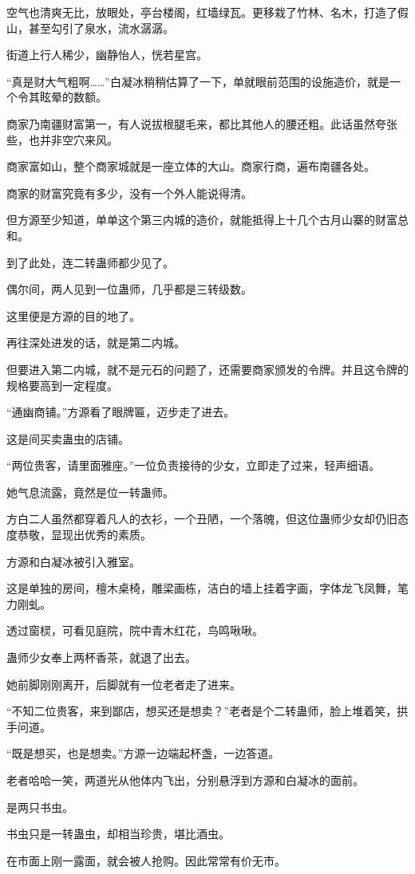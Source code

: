 \begin{this_body}
空气也清爽无比，放眼处，亭台楼阁，红墙绿瓦。更移栽了竹林、名木，打造了假山，甚至勾引了泉水，流水潺潺。

街道上行人稀少，幽静怡人，恍若星宫。

“真是财大气粗啊……”白凝冰稍稍估算了一下，单就眼前范围的设施造价，就是一个令其眩晕的数额。

商家乃南疆财富第一，有人说拔根腿毛来，都比其他人的腰还粗。此话虽然夸张些，也并非空穴来风。

商家富如山，整个商家城就是一座立体的大山。商家行商，遍布南疆各处。

商家的财富究竟有多少，没有一个外人能说得清。

但方源至少知道，单单这个第三内城的造价，就能抵得上十几个古月山寨的财富总和。

到了此处，连二转蛊师都少见了。

偶尔间，两人见到一位蛊师，几乎都是三转级数。

这里便是方源的目的地了。

再往深处进发的话，就是第二内城。

但要进入第二内城，就不是元石的问题了，还需要商家颁发的令牌。并且这令牌的规格要高到一定程度。

“通幽商铺。”方源看了眼牌匾，迈步走了进去。

这是间买卖蛊虫的店铺。

“两位贵客，请里面雅座。”一位负责接待的少女，立即走了过来，轻声细语。

她气息流露，竟然是位一转蛊师。

方白二人虽然都穿着凡人的衣衫，一个丑陋，一个落魄，但这位蛊师少女却仍旧态度恭敬，显现出优秀的素质。

方源和白凝冰被引入雅室。

这是单独的房间，檀木桌椅，雕梁画栋，洁白的墙上挂着字画，字体龙飞凤舞，笔力刚虬。

透过窗棂，可看见庭院，院中青木红花，鸟鸣啾啾。

蛊师少女奉上两杯香茶，就退了出去。

她前脚刚刚离开，后脚就有一位老者走了进来。

“不知二位贵客，来到鄙店，想买还是想卖？”老者是个二转蛊师，脸上堆着笑，拱手问道。

“既是想买，也是想卖。”方源一边端起杯盏，一边答道。

老者哈哈一笑，两道光从他体内飞出，分别悬浮到方源和白凝冰的面前。

是两只书虫。

书虫只是一转蛊虫，却相当珍贵，堪比酒虫。

在市面上刚一露面，就会被人抢购。因此常常有价无市。


\end{this_body}
